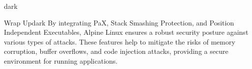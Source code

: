 \begin{baseBoxThree}{}{dark}
    \smallskip
    \begin{baseBoxThree}{Wrap Up}{dark}
        By integrating PaX, Stack Smashing Protection, and Position Independent Executables, Alpine Linux ensures a robust security posture against various types of attacks.
        These features help to mitigate the risks of memory corruption, buffer overflows, and code injection attacks, providing a secure environment for running applications.
    \end{baseBoxThree}
    \smallskip
\end{baseBoxThree}

